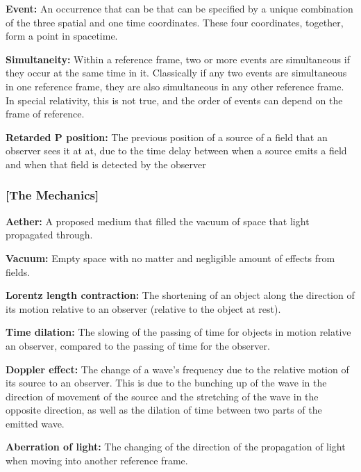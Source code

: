 \noindent \hypertarget{def-event}{\textbf{Event:}}
An occurrence that can be that can be specified by a unique combination of the three spatial and one time coordinates. These four coordinates, together, form a point in spacetime.

\noindent \hypertarget{def-simultaneity}{\textbf{Simultaneity:}}
Within a reference frame, two or more events are simultaneous if they occur at the same time in it. Classically if any two events are simultaneous in one reference frame, they are also simultaneous in any other reference frame. In special relativity, this is not true, and the order of events can depend on the frame of reference.

\noindent \hypertarget{def-retarded-position}{\textbf{Retarded P
position:}}
The previous position of a source of a field that an observer sees it at at, due to the time delay between when a source emits a field and when that field is detected by the observer


\subsubsection{[The Mechanics]}%

\noindent \hypertarget{def-aether}{\textbf{Aether:}}
A proposed medium that filled the vacuum of space that light propagated through.

\noindent \hypertarget{def-vacuum}{\textbf{Vacuum:}}
Empty space with no matter and negligible amount of effects from fields.

\noindent \hypertarget{def-length-contraction}{\textbf{Lorentz length contraction:}}
The shortening of an object along the direction of its motion relative to an observer (relative to the object at rest).

\noindent \hypertarget{def-time-dilation}{\textbf{Time dilation:}}
The slowing of the passing of time for objects in motion relative an observer, compared to the passing of time for the observer.

\noindent \hypertarget{def-doppler-effect}{\textbf{Doppler effect:}}
The change of a wave's frequency due to the relative motion of its source to an observer. This is due to the bunching up of the wave in the direction of movement of the source and the stretching of the wave in the opposite direction, as well as the dilation of time between two parts of the emitted wave.

\noindent \hypertarget{def-aberration}{\textbf{Aberration of light:}}
The changing of the direction of the propagation of light when moving into another reference frame.

